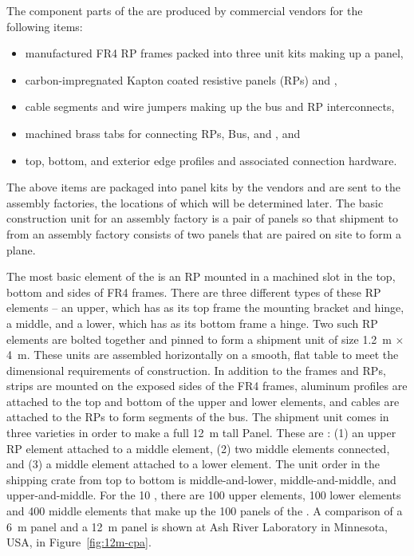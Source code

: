 The component parts of the  %
are produced by commercial vendors for the following items:
\begin{itemize}
\item manufactured FR4 RP frames packed into three  unit kits making up a  panel,
\item carbon-impregnated Kapton coated resistive panels (RPs) and ,
\item {} cable segments and wire jumpers making up the   bus and RP interconnects,
\item machined brass tabs for connecting RPs,  Bus, and , and
\item top, bottom, and exterior edge profiles and associated connection hardware.
\end{itemize}
The above items are packaged into  panel kits by the vendors and are sent to the assembly factories, the locations of which will be determined later.  The basic construction unit for an assembly factory is a pair of  panels so that shipment to \surf from an assembly factory consists of two  panels that are paired on site to form a  plane.

The most basic element of the  is an RP mounted in a machined slot in the top, bottom and sides of FR4 frames.  There are three different types of these  RP elements -- an upper, which has as its top frame the  mounting bracket and  hinge, a middle, and a lower, which has as its bottom frame a  hinge.  Two such  RP elements are bolted together and pinned to form a shipment  unit of size \SI{1.2}{\m} $\times$ \SI{4}{\m}.  These  units are assembled horizontally on a smooth, flat table to meet the dimensional requirements of  construction.  In addition to the frames and RPs, %
 strips are mounted on the exposed sides of the FR4 frames, aluminum profiles are attached to the top and bottom of the upper and lower elements, and cables are attached to the RPs to form segments of the  bus.  The shipment  unit comes in three varieties in order to make a full \SI{12}{\m} tall  Panel.  These are : (1) an upper  RP element attached to a middle element, (2) two middle elements connected, and (3) a middle element attached to a lower element.  The  unit order in the shipping crate from top to bottom is middle-and-lower, middle-and-middle, and upper-and-middle.  For the \SI{10}{\kt} , there are 100 upper elements, 100 lower elements and 400 middle elements that make up the 100  panels of the .
A comparison of a \SI{6}{\m}   panel and a \SI{12}{\m}  panel is shown at Ash River Laboratory in Minnesota, USA,  in Figure~\ref{fig:12m-cpa}.

